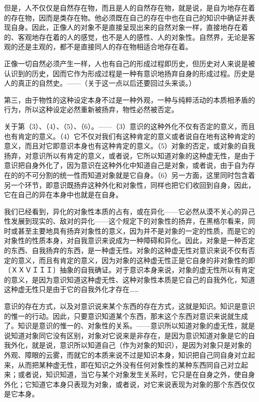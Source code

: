 \documentclass[a4paper,twoside,12pt,AutoFakeBold]{ctexart}
\begin{document}
但是，人不仅仅是自然存在物，而且是人的自然存在物，就是说，是自为地存在着的存在物，因而是类存在物。他必须既在自己的存在中也在自己的知识中确证并表现自身。因此，正像人的对象不是直接呈现出来的自然对象一样，直接地存在着的、客观地存在着的人的感觉，也不是人的感性、人的对象性。自然界，无论是客观的还是主观的，都不是直接同人的存在物相适合地存在着。

正像一切自然必须产生一样，人也有自己的形成过程即历史，但历史对人来说是被认识到的历史，因而它作为形成过程是一种有意识地扬弃自身的形成过程。历史是人的真正的自然史。——（关于这一点以后还要回过头来谈。）

第三，由于物性的这种设定本身不过是一种外观，一种与纯粹活动的本质相矛盾的行为，所以这种设定必然重新被扬弃，物性必然被否定。

关于第（3）、（4）、（5）、（6）。——（3）意识的这种外化不仅有否定的意义，而且也有肯定的意义。（4）它不仅对我们有这种肯定的意义或者说自在地有这种肯定的意义，而且对它即意识本身也有这种肯定的意义。（5）对象的否定，或对象的自我扬弃，对意识所以有肯定的意义，或者说，它所以知道对象的这种虚无性，是由于意识把自身外化了，因为意识在这种外化中知道自己是对象，或者说，由于自为存在的的不可分割的统一性而知道对象就是它自身。（6）另一方面，这里同时包含着另一个环节，即意识既扬弃这种外化和对象性，同样也把它们收回到自身，因此，它在自己的异在本身中也就是在自身。

我们已经看到，异化的对象性本质的占有，或在异化——它必然从漠不关心的异己性发展到现实的、敌对的异化——这个规定下的对象性的扬弃，在黑格尔看来，同时或甚至主要地具有扬弃对象性的意义，因为并不是对象的一定的性质，而是它的对象性的性质本身，对自我意识来说成为一种障碍和异化。因此，对象是一种否定的东西、自我扬弃的东西，是一种虚无性。对象的这种虚无性对意识来说不仅有否定的意义，而且有肯定的意义，因为对象的这种虚无性正是它自身的非对象性的即〔ＸＸＶＩＩＩ〕抽象的自我确证。对于意识本身来说，对象的虚无性所以有肯定的意义，是因为意识知道这种虚无性、这种对象性本质是它自己的自我外化，知道这种虚无性只是由于它的自我外化才存在……

意识的存在方式，以及对意识说来某个东西的存在方式，这就是知识。知识是意识的惟一的行动。因此，只要意识知道某个东西，那末这个东西对意识来说就生成了。知识是意识的惟一的、对象性的关系。——意识所以知道对象的虚无性，就是说知道对象同它没有区别，对象对它说来是非存在，是因为意识知道对象是它的自我外化，就是说，意识所以知道自己（作为对象的知识），是因为对象只是对象的外观、障眼的云雾，而就它的本质来说不过是知识本身，知识把自己同自身对立起来，从而把某种虚无性，即在知识之外没有任何对象性的某种东西同自己对立起来；或者说，知识知道，当它与某个对象发生关系时，它只是在自身之外，使自身外化；它知道它本身只表现为对象，或者说，对它来说表现为对象的那个东西仅仅是它本身。
\end{document}
